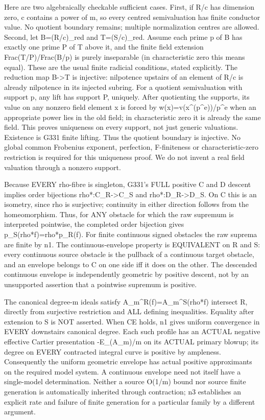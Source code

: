 \documentclass[11pt]{article}
\begin{document}
Here are two algebraically checkable sufficient cases. First, if R/c has dimension zero, c contains a power of m, so every centred semivaluation has finite conductor value. No quotient boundary remains; multiple normalization centres are allowed. Second, let B=(R/c)\_red and T=(S/c)\_red. Assume each prime p of B has exactly one prime P of T above it, and the finite field extension Frac(T/P)/Frac(B/p) is purely inseparable (in characteristic zero this means equal). These are the usual finite radicial conditions, stated explicitly. The reduction map B-\textgreater{}T is injective: nilpotence upstairs of an element of R/c is already nilpotence in its injected subring. For a quotient semivaluation with support p, any lift has support P, uniquely. After quotienting the supports, its value on any nonzero field element x is forced by w(x)=v(x\textasciicircum{}(p\textasciicircum{}e))/p\textasciicircum{}e when an appropriate power lies in the old field; in characteristic zero it is already the same field. This proves uniqueness on every support, not just generic valuations. Existence is G331 finite lifting. Thus the quotient boundary is injective. No global common Frobenius exponent, perfection, F-finiteness or characteristic-zero restriction is required for this uniqueness proof. We do not invent a real field valuation through a nonzero support.

Because EVERY rho-fibre is singleton, G331's FULL positive C and D descent implies order bijections rho*:C\_R-\textgreater{}C\_S and rho*:D\_R-\textgreater{}D\_S. On C this is an isometry, since rho is surjective; continuity in either direction follows from the homeomorphism. Thus, for ANY obstacle for which the raw supremum is interpreted pointwise, the completed order bijection gives p\_S(rho*f)=rho*p\_R(f). For finite continuous signed obstacles the raw suprema are finite by n1. The continuous-envelope property is EQUIVALENT on R and S: every continuous source obstacle is the pullback of a continuous target obstacle, and an envelope belongs to C on one side iff it does on the other. The descended continuous envelope is independently geometric by positive descent, not by an unsupported assertion that a pointwise supremum is positive.

The canonical degree-m ideals satisfy A\_m\textasciicircum{}R(f)=A\_m\textasciicircum{}S(rho*f) intersect R, directly from surjective restriction and ALL defining inequalities. Equality after extension to S is NOT asserted. When CE holds, n1 gives uniform convergence in EVERY downstairs canonical degree. Each such profile has an ACTUAL negative effective Cartier presentation -E\_(A\_m)/m on its ACTUAL primary blowup; its degree on EVERY contracted integral curve is positive by ampleness. Consequently the uniform geometric envelope has actual positive approximants on the required model system. A continuous envelope need not itself have a single-model determination. Neither a source O(1/m) bound nor source finite generation is automatically inherited through contraction; n3 establishes an explicit rate and failure of finite generation for a particular family by a different argument.
\end{document}
